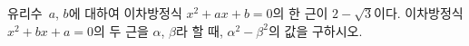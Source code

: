 유리수~$a$, $b$에 대하여 이차방정식 $x^2+ax+b=0$의 한 근이 $2-\sqrt{3}$이다. 이차방정식 $x^2+bx+a=0$의 두 근을 $\alpha$, $\beta$라 할 때, $\alpha^2-\beta^2$의 값을 구하시오. \cond{$\alpha>\beta$}

